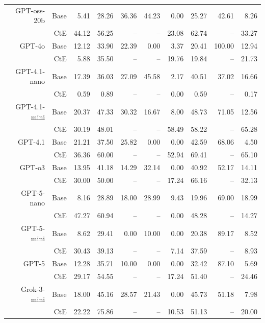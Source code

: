 \begin{table}[!t]
\begin{tabular}{r r !{\color{white!80!black} \vline} r r r r r !{\color{white!80!black} \vline} r r r}
\midrule
\sf GPT-oss-20b & Base & 5.41 & 28.26 & 36.36 & 44.23 & 0.00 & 25.27 & 42.61 & 8.26 \\
 & CtE & 44.12 & 56.25 & -- & -- & 23.08 & 62.74 & -- & 33.27 \\
\midrule
\sf GPT-4o & Base & 12.12 & 33.90 & 22.39 & 0.00 & 3.37 & 20.41 & 100.00 & 12.94 \\
 & CtE & 5.88 & 35.50 & -- & -- & 19.76 & 19.84 & -- & 21.73 \\
\midrule
\sf GPT-4.1-nano & Base & 17.39 & 36.03 & 27.09 & 45.58 & 2.17 & 40.51 & 37.02 & 16.66 \\
 & CtE & 0.59 & 0.89 & -- & -- & 0.00 & 0.59 & -- & 0.17 \\
\midrule
\sf GPT-4.1-mini & Base & 20.37 & 47.33 & 30.32 & 16.67 & 8.00 & 48.73 & 71.05 & 12.56 \\
 & CtE & 30.19 & 48.01 & -- & -- & 58.49 & 58.22 & -- & 65.28 \\
\midrule
\sf GPT-4.1 & Base & 21.21 & 37.50 & 25.82 & 0.00 & 0.00 & 42.59 & 68.06 & 4.50 \\
 & CtE & 36.36 & 60.00 & -- & -- & 52.94 & 69.41 & -- & 65.10 \\
\midrule
\sf GPT-o3 & Base & 13.95 & 41.18 & 14.29 & 32.14 & 0.00 & 40.92 & 52.17 & 14.11 \\
 & CtE & 30.00 & 50.00 & -- & -- & 17.24 & 66.16 & -- & 32.13 \\
\midrule
\sf GPT-5-nano & Base & 8.16 & 28.89 & 18.00 & 28.99 & 9.43 & 19.96 & 69.00 & 18.99 \\
 & CtE & 47.27 & 60.94 & -- & -- & 0.00 & 48.28 & -- & 14.27 \\
\midrule
\sf GPT-5-mini & Base & 8.62 & 29.41 & 0.00 & 10.00 & 0.00 & 20.38 & 89.17 & 8.52 \\
 & CtE & 30.43 & 39.13 & -- & -- & 7.14 & 37.59 & -- & 8.93 \\
\midrule
\sf GPT-5 & Base & 12.28 & 35.71 & 10.00 & 0.00 & 0.00 & 32.42 & 87.10 & 5.69 \\
 & CtE & 29.17 & 54.55 & -- & -- & 17.24 & 51.40 & -- & 24.46 \\
\midrule
\sf Grok-3-mini & Base & 18.00 & 45.16 & 28.57 & 21.43 & 0.00 & 45.73 & 51.18 & 7.98 \\
 & CtE & 22.22 & 75.86 & -- & -- & 10.53 & 51.13 & -- & 20.00 \\
\bottomrule
\end{tabular}
\label{tab:cRi-}
\end{table}